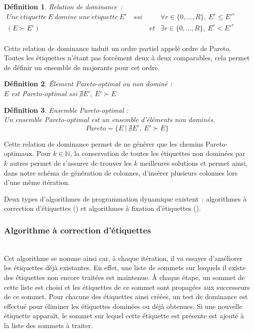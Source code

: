 \documentclass[10pt,francais]{llncs}
\newtheorem{defs}{D\'efinition}
\begin{document}
\begin{defs}
Relation de dominance~:\\
$\begin{array}{ccll}
Une\ \acute{e}tiquette\ E\ domine\ une\ \acute{e}tiquette\ E' &\ ssi\ & & \forall r\in\{0,\ldots,R\},~E^r \leq E'^r\\
(E \succ E') & &et& \exists r\in\{0,\ldots,R\},~E^r < E'^r\\
\end{array}$
\end{defs}
Cette relation de dominance induit un ordre partiel appel\'e ordre de Pareto. Toutes les \'etiquettes n'\'etant pas forc\'ement deux \`a deux comparables, cela permet de d\'efinir un ensemble de majorants pour cet ordre.
\begin{defs}
\'Element Pareto-optimal ou non domin\'e :\\
$E$ est Pareto-optimal $ssi\ \nexists E',\ E' \succ E$
\end{defs}
\begin{defs}
Ensemble Pareto-optimal :\\
Un ensemble Pareto-optimal est un ensemble d'\'el\'ements non domin\'es.\\
$$Pareto =\{E\ |\ \nexists E',\ E' \succ E\}$$
\end{defs}
Cette relation de dominance permet de ne g\'en\'erer que les chemins Pareto-optimaux. Pour $k \in \mathbb{N}$, la conservation de toutes les \'etiquettes non domin\'ees par $k$ autres permet de s'assurer de trouver les $k$ meilleures solutions et permet ainsi, dans notre sch\'ema de g\'en\'eration de colonnes, d'ins\'erer plusieurs colonnes lors d'une m\^eme it\'eration.

Deux types d'algorithmes de programmation dynamique existent~: algorithmes \`a correction d'\'etiquettes (\cite{Desrosiers1983}) et algorithmes \`a fixation d'\'etiquettes (\cite{Desrochers1988}).

\subsubsection{Algorithme \`a correction d'\'etiquettes \cite{Desrosiers1983}}\label{subsub-resol-progdyn-corr}
~\\
Cet algorithme se nomme ainsi car, \`a chaque it\'eration, il va essayer d'am\'eliorer les \'etiquettes d\'ej\`a existantes. En effet, une liste de sommets sur lesquels il existe des \'etiquettes non encore trait\'ees est maintenue. \`A chaque \'etape, un sommet de cette liste est choisi et les \'etiquettes de ce sommet sont propag\'ees aux successeurs de ce sommet. Pour chacune des \'etiquettes ainsi cr\'e\'ees, un test de dominance est effectu\'e pour \'eliminer les \'etiquettes domin\'ees ou d\'ej\`a obtenues. Si une nouvelle \'etiquette appara\^it, le sommet sur lequel cette \'etiquette est pr\'esente est ajout\'e \`a la liste des sommets \`a traiter.
\end{document}
